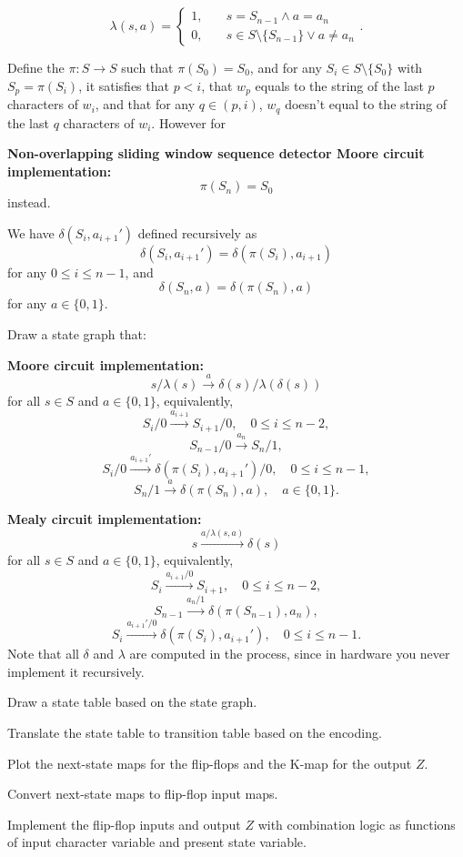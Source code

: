 \documentclass[a4paper,12pt]{report}
\begin{document}
\[\lambda(s,a)=\begin{cases}
1,\quad&s=S_{n-1}\land a=a_n\\
0,\quad&s\in S\setminus\{S_{n-1}\}\lor a\neq a_n
\end{cases}.\]
\eit
\item Define the  $\pi\colon S\to S$ such that $\pi(S_0)=S_0$, and for any $S_i\in S\setminus\{S_0\}$ with $S_p=\pi(S_i)$, it satisfies that $p<i$, that $w_p$ equals to the string of the last $p$ characters of $w_i$, and that for any $q\in(p,i)$, $w_q$ doesn't equal to the string of the last $q$ characters of $w_i$. However for
\bit
\item \textbf{Non-overlapping sliding window sequence detector Moore circuit implementation:}
\[\pi(S_n)=S_0\]
instead.
\eit
\item We have $\delta(S_i,a_{i+1}')$ defined recursively as
\[\delta(S_i,a_{i+1}')=\delta(\pi(S_i),a_{i+1})\]
for any $0\leq i\leq n-1$, and
\[\delta(S_n,a)=\delta(\pi(S_n),a)\]
for any $a\in\{0,1\}$.
\item Draw a state graph that:
\bit
\item \textbf{Moore circuit implementation:}
\[s/\lambda(s)\xrightarrow{a}\delta(s)/\lambda(\delta(s))\]
for all $s\in S$ and $a\in\{0,1\}$, equivalently,
\[S_i/0\xrightarrow{a_{i+1}}S_{i+1}/0,\quad 0\leq i\leq n-2,\]
\[S_{n-1}/0\xrightarrow{a_n}S_n/1,\]
\[S_i/0\xrightarrow{a_{i+1}'}\delta(\pi(S_i),a_{i+1}')/0,\quad 0\leq i\leq n-1,\]
\[S_n/1\xrightarrow{a}\delta(\pi(S_n),a),\quad a\in\{0,1\}.\]
\item\textbf{Mealy circuit implementation:}
\[s\xrightarrow{a/\lambda(s,a)}\delta(s)\]
for all $s\in S$ and $a\in\{0,1\}$, equivalently,
\[S_i\xrightarrow{a_{i+1}/0}S_{i+1},\quad 0\leq i\leq n-2,\]
\[S_{n-1}\xrightarrow{a_n/1}\delta(\pi(S_{n-1}),a_n),\]
\[S_i\xrightarrow{a_{i+1}'/0}\delta(\pi(S_i),a_{i+1}'),\quad 0\leq i\leq n-1.\]
\eit
Note that all $\delta$ and $\lambda$ are computed in the process, since in hardware you never implement it recursively.
\item Draw a state table based on the state graph.
\item Translate the state table to transition table based on the encoding.
\item Plot the next-state maps for the flip-flops and the K-map for the output $Z$.
\item Convert next-state maps to flip-flop input maps.
\item Implement the flip-flop inputs and output $Z$ with combination logic as functions of input character variable and present state variable.
\end{document}
